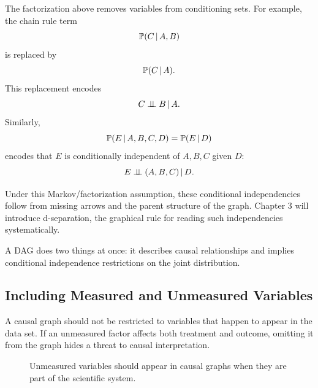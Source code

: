 The factorization above removes variables from conditioning sets. For example, the chain rule term
\[
\mathbb{P}(C\,\vert\, A,B)
\]
is replaced by
\[
\mathbb{P}(C\,\vert\, A).
\]
This replacement encodes
\[
C\perp\!\!\!\perp B\,\vert\, A.
\]
Similarly,
\[
\mathbb{P}(E\,\vert\, A,B,C,D)=\mathbb{P}(E\,\vert\, D)
\]
encodes that $E$ is conditionally independent of $A,B,C$ given $D$:
\[
E\perp\!\!\!\perp (A,B,C)\,\vert\, D.
\]

Under this Markov/factorization assumption, these conditional independencies
follow from missing arrows and the parent structure of the graph. Chapter 3 will
introduce d-separation, the graphical rule for reading such independencies
systematically.

\begin{keyidea}
A DAG does two things at once: it describes causal relationships and implies conditional independence restrictions on the joint distribution.
\end{keyidea}

\subsection{Including Measured and Unmeasured Variables}

A causal graph should not be restricted to variables that happen to appear in the data set. If an unmeasured factor affects both treatment and outcome, omitting it from the graph hides a threat to causal interpretation.

\begin{figure}[H]
\centering
{}
\caption{Unmeasured variables should appear in causal graphs when they are part of the scientific system.}
\end{figure}

